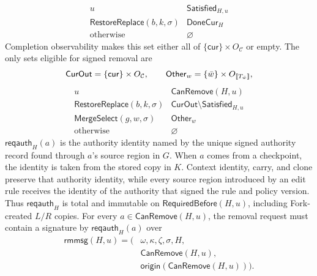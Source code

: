 \begin{definition}
\[\begin{array}{c|c}
u&\mathsf{Satisfied}_{H,u}\\ \hline
\mathsf{RestoreReplace}(b,k,\sigma)&\mathsf{DoneCur}_H\\
\text{otherwise}&\varnothing
\end{array}
\]
Completion observability makes this set either all of \(\{\mathsf{cur}\}\times O_{\mathcal C}\) or empty.
The only sets eligible for signed removal are
\[
\mathsf{CurOut}=\{\mathsf{cur}\}\times O_{\mathcal C},
\qquad
\mathsf{Other}_w=\{\bar w\}\times O_{\mathopen{[\![}T_{\bar w}\mathclose{]\!]}},
\]
\[
\begin{array}{c|c}
u&\mathsf{CanRemove}(H,u)\\ \hline
\mathsf{RestoreReplace}(b,k,\sigma)&
 \mathsf{CurOut}\setminus\mathsf{Satisfied}_{H,u}\\
\mathsf{MergeSelect}(g,w,\sigma)&\mathsf{Other}_w\\
\text{otherwise}&\varnothing
\end{array}
\]
\(\mathsf{reqauth}_H(a)\) is the authority identity named by the unique signed authority record found through \(a\)'s source region in \(G\).
When \(a\) comes from a checkpoint, the identity is taken from the stored copy in \(K\).
Context identity, carry, and clone preserve that authority identity, while every source region introduced by an edit rule receives the identity of the authority that signed the rule and policy version.
Thus \(\mathsf{reqauth}_H\) is total and immutable on \(\mathsf{RequiredBefore}(H,u)\), including Fork-created \(L/R\) copies.
For every \(a\in\mathsf{CanRemove}(H,u)\), the removal request must contain a signature by \(\mathsf{reqauth}_H(a)\) over
\[
\begin{aligned}
\mathsf{rmmsg}(H,u)=(
&\omega,\kappa,\zeta,\sigma,H,\\
&\mathsf{CanRemove}(H,u),\\
&\mathsf{origin}(\mathsf{CanRemove}(H,u))).
\end{aligned}
\]
\end{definition}
